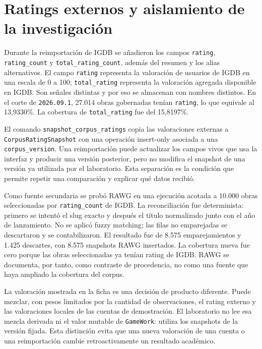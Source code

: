 \section{Ratings externos y aislamiento de la investigación}\label{sec:datos-ratings}

Durante la reimportación de IGDB se añadieron los campos \texttt{rating},
\texttt{rating\_count} y \texttt{total\_rating\_count}, además del resumen y los alias
alternativos. El campo \texttt{rating} representa la valoración de usuarios de IGDB en una
escala de 0 a 100; \texttt{total\_rating} representa la valoración agregada disponible en
IGDB. Son señales distintas y por eso se almacenan con nombres distintos. En el corte de
\texttt{2026.09.1}, 27.014 obras gobernadas tenían \texttt{rating}, lo que equivale al
13,9330\%. La cobertura de \texttt{total\_rating} fue del 15,8197\%.

El comando \texttt{snapshot\_corpus\_ratings} copia las valoraciones externas a
\texttt{CorpusRatingSnapshot} con una operación insert-only asociada a una
\texttt{corpus\_version}. Una reimportación puede actualizar los campos vivos que usa la
interfaz y producir una versión posterior, pero no modifica el snapshot de una versión ya
utilizada por el laboratorio. Esta separación es la condición que permite repetir una
comparación y explicar qué datos recibió.

Como fuente secundaria se probó RAWG en una ejecución acotada a 10.000 obras seleccionadas
por \texttt{rating\_count} de IGDB. La reconciliación fue determinista: primero se intentó
el slug exacto y después el título normalizado junto con el año de lanzamiento. No se aplicó
fuzzy matching; las filas no emparejadas se descartaron y se contabilizaron. El resultado
fue de 8.575 emparejamientos y 1.425 descartes, con 8.575 snapshots RAWG insertados. La
cobertura nueva fue cero porque las obras seleccionadas ya tenían rating de IGDB. RAWG se
documenta, por tanto, como contraste de procedencia, no como una fuente que haya ampliado
la cobertura del corpus.

La valoración mostrada en la ficha es una decisión de producto diferente. Puede mezclar,
con pesos limitados por la cantidad de observaciones, el rating externo y las valoraciones
locales de las cuentas de demostración. El laboratorio no lee esa mezcla derivada ni el
valor mutable de \texttt{GameWork}: utiliza los snapshots de la versión fijada. Esta
distinción evita que una nueva valoración de una cuenta o una reimportación cambie
retroactivamente un resultado académico.


